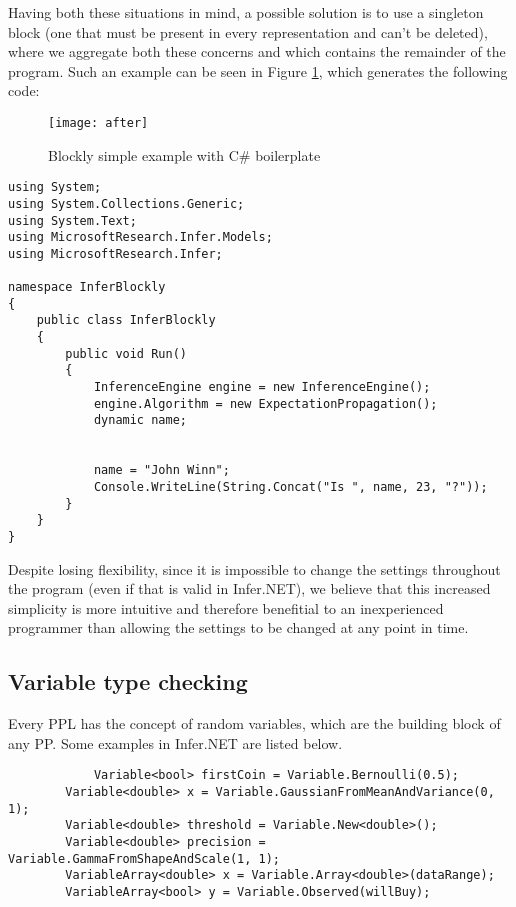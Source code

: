 Having both these situations in mind, a possible solution is to use a singleton
block (one that must be present in every representation and can't be deleted),
where we aggregate both these concerns and which contains the remainder of the program.
Such an example can be seen in Figure \ref{fig:after}, which generates the following code:

\begin{figure}[t]
  \begin{center}
    \leavevmode
    \texttt{[image: after]}
    \caption{Blockly simple example with C# boilerplate}
    \label{fig:after}
  \end{center}
\end{figure}

\begin{lstlisting}
using System;
using System.Collections.Generic;
using System.Text;
using MicrosoftResearch.Infer.Models;
using MicrosoftResearch.Infer;

namespace InferBlockly
{
	public class InferBlockly
	{
		public void Run()
		{
			InferenceEngine engine = new InferenceEngine();
			engine.Algorithm = new ExpectationPropagation();
			dynamic name;


			name = "John Winn";
			Console.WriteLine(String.Concat("Is ", name, 23, "?"));
		}
	}
}
\end{lstlisting}

Despite losing flexibility, since it is impossible to change the settings
throughout the program (even if that is valid in Infer.NET),
we believe that this increased simplicity is more intuitive and therefore benefitial to an inexperienced
programmer than allowing the settings to be changed at any point in time.

\subsection{Variable type checking}

Every PPL has the concept of random variables, which are the building block of
any PP. Some examples in Infer.NET are listed below.

\begin{lstlisting}
  			Variable<bool> firstCoin = Variable.Bernoulli(0.5);
        Variable<double> x = Variable.GaussianFromMeanAndVariance(0, 1);
        Variable<double> threshold = Variable.New<double>();
        Variable<double> precision = Variable.GammaFromShapeAndScale(1, 1);
        VariableArray<double> x = Variable.Array<double>(dataRange);
        VariableArray<bool> y = Variable.Observed(willBuy);
\end{lstlisting}

